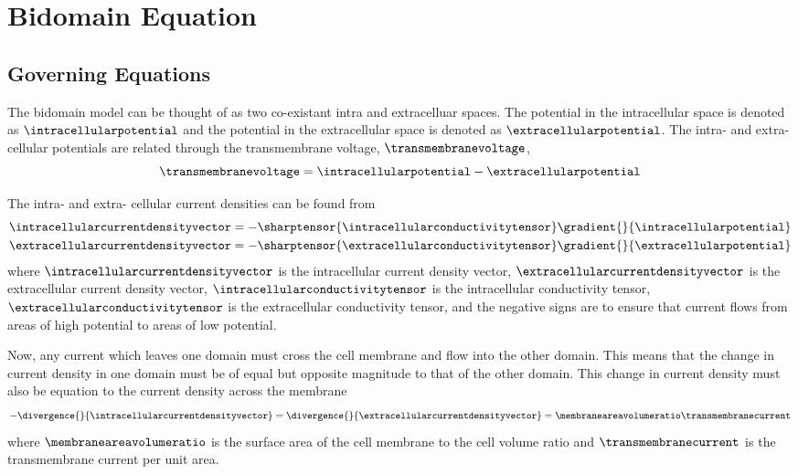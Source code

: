 \section{Bidomain Equation}
\label{sec:Bidomain}

\subsection{Governing Equations}
\label{subsec:BidomainGoverningEquations}

The bidomain model \citep{henriquez:1993} can be thought of as two
co-existant intra and extracelluar spaces. The potential in the
intracellular space is denoted as $\intracellularpotential$ and the
potential in the extracellular space is denoted as
$\extracellularpotential$. The intra- and extra-cellular potentials are
related through the transmembrane voltage, $\transmembranevoltage$,
\ie
\begin{equation}
  \transmembranevoltage=\intracellularpotential-\extracellularpotential
  \label{eqn:TransMembraneVoltageDefinition}
\end{equation} 

The intra- and extra- cellular current densities can be found from
\begin{align}
  \intracellularcurrentdensityvector&=
  -\sharptensor{\intracellularconductivitytensor}\gradient{}{\intracellularpotential}
  \label{eqn:IntraCellularCurrentDensityVectorDefinition} \\
  \extracellularcurrentdensityvector&=
  -\sharptensor{\extracellularconductivitytensor}\gradient{}{\extracellularpotential}
  \label{eqn:ExtraCellularCurrentDensityVectorDefinition}  
\end{align}
where $\intracellularcurrentdensityvector$ is the intracellular
current density vector, $\extracellularcurrentdensityvector$ is the
extracellular current density vector,
$\intracellularconductivitytensor$ is the intracellular conductivity
tensor, $\extracellularconductivitytensor$ is the extracellular
conductivity tensor, and the negative signs are to ensure that current
flows from areas of high potential to areas of low potential.

Now, any current which leaves one domain must cross the cell membrane
and flow into the other domain. This means that the change in current
density in one domain must be of equal but opposite magnitude to that
of the other domain. This change in current density must also be
equation to the current density across the membrane \ie
\begin{equation}
  -\divergence{}{\intracellularcurrentdensityvector}=
  \divergence{}{\extracellularcurrentdensityvector}=
  \membraneareavolumeratio\transmembranecurrent
  \label{eqn:BidomainConservationOfCurrent}
\end{equation}
where $\membraneareavolumeratio$ is the surface area of the cell
membrane to the cell volume ratio and $\transmembranecurrent$ is the
transmembrane current per unit area.

